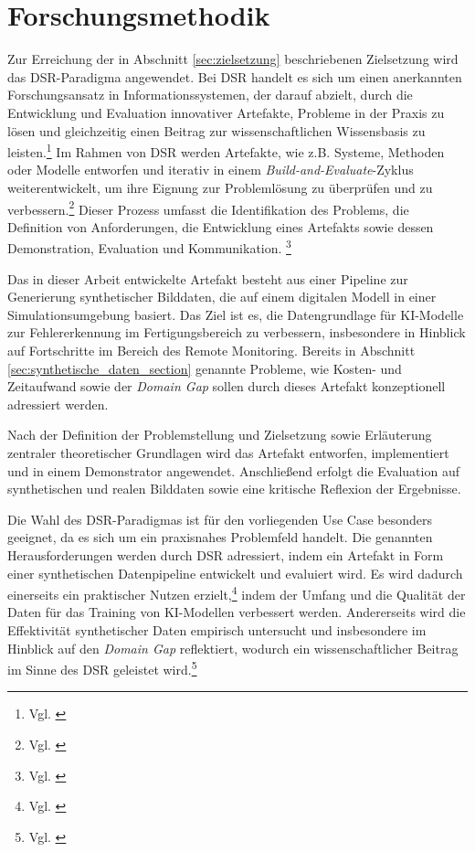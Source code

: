 \section{Forschungsmethodik}\label{sec:forschungsmethodik}
Zur Erreichung der in Abschnitt \ref{sec:zielsetzung} beschriebenen Zielsetzung wird das \ac{DSR}-Paradigma angewendet. Bei \ac{DSR} handelt es sich um einen anerkannten Forschungsansatz in Informationssystemen, der darauf abzielt, durch die Entwicklung und Evaluation innovativer Artefakte, Probleme in der Praxis zu lösen und gleichzeitig einen Beitrag zur wissenschaftlichen Wissensbasis zu leisten.\footnote{Vgl. \cite[S.337]{the_australian_national_university_positioning_2013}}
Im Rahmen von \ac{DSR} werden Artefakte, wie z.B. Systeme, Methoden oder Modelle entworfen und iterativ in einem \textit{Build-and-Evaluate}-Zyklus weiterentwickelt, um ihre Eignung zur Problemlösung zu überprüfen und zu verbessern.\footnote{Vgl. \cite[78]{hevner_design_2004}} Dieser Prozess umfasst die Identifikation des Problems, die Definition von Anforderungen, die Entwicklung eines Artefakts sowie dessen Demonstration, Evaluation und Kommunikation. \footnote{Vgl. \cite{peffers_design_2007}}

Das in dieser Arbeit entwickelte Artefakt besteht aus einer Pipeline zur Generierung synthetischer Bilddaten, die auf einem digitalen Modell in einer Simulationsumgebung basiert. Das Ziel ist es, die Datengrundlage für \ac{KI}-Modelle zur Fehlererkennung im Fertigungsbereich zu verbessern, insbesondere in Hinblick auf Fortschritte im Bereich des Remote Monitoring. Bereits in Abschnitt \ref{sec:synthetische_daten_section} genannte Probleme, wie Kosten- und Zeitaufwand sowie der \textit{Domain Gap} sollen durch dieses Artefakt konzeptionell adressiert werden. 

Nach der Definition der Problemstellung und Zielsetzung sowie Erläuterung zentraler theoretischer Grundlagen wird das Artefakt entworfen, implementiert und in einem Demonstrator angewendet. Anschließend erfolgt die Evaluation auf synthetischen und realen Bilddaten sowie eine kritische Reflexion der Ergebnisse.

Die Wahl des \ac{DSR}-Paradigmas ist für den vorliegenden Use Case besonders geeignet, da es sich um ein praxisnahes Problemfeld handelt. Die genannten Herausforderungen werden durch \ac{DSR} adressiert, indem ein Artefakt in Form einer synthetischen Datenpipeline entwickelt und evaluiert wird. Es wird dadurch einerseits ein praktischer Nutzen erzielt,\footnote{Vgl. \cite[341]{the_australian_national_university_positioning_2013}} indem der Umfang und die Qualität der Daten für das Training von \ac{KI}-Modellen verbessert werden. Andererseits wird die Effektivität synthetischer Daten empirisch untersucht und insbesondere im Hinblick auf den \textit{Domain Gap} reflektiert, wodurch ein wissenschaftlicher Beitrag im Sinne des \ac{DSR} geleistet wird.\footnote{Vgl. \cite[342]{the_australian_national_university_positioning_2013}}

